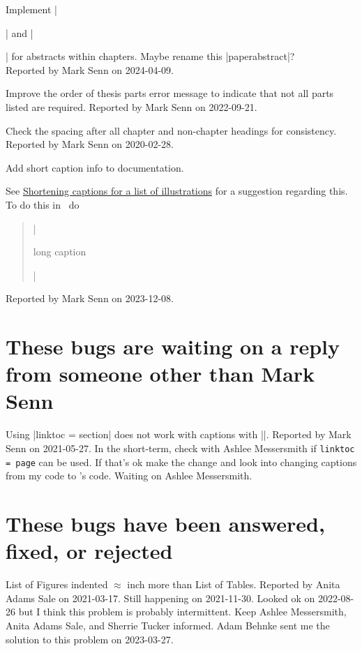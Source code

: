 Implement |\begin{chapterabstract}|
and |\end{chapterabstract}|
for abstracts within chapters.
Maybe rename this |paperabstract|?\\
{\small
  Reported by Mark Senn on 2024-04-09.
}

Improve the order of thesis parts error message
to indicate that not all parts listed are required.
{\small
  Reported by Mark Senn on 2022-09-21.%
}

Check the spacing after all chapter and non-chapter headings
for consistency.
{\small
  Reported by Mark Senn on 2020-02-28.%
}

Add short caption info to documentation.
{\small
  See
  \href{https://www-chicagomanualofstyle-org.ezproxy.lib.purdue.edu/book/ed17/part1/ch03/psec040.html}{Shortening captions for a list of illustrations}
  for a suggestion regarding this.
  To do this in \LaTeXLogo\ do\hfil\break
  \begin{quote}
    |\caption[short caption]{long caption}|
  \end{quote}
  Reported by Mark Senn on 2023-12-08.%
}

\section{These bugs are waiting on a reply from someone other than Mark Senn}

Using
|linktoc = section|
does not work with captions with
|\frac|.
{\small
  Reported by Mark Senn on 2021-05-27.
  In the short-term,
  check with Ashlee Messersmith
  if {\tt linktoc = page} can be used.
  If that's ok make the change
  and look into changing captions from my code
  to \LaTeXLogo's code.
  Waiting on Ashlee Messersmith.
}


\section{These bugs have been answered, fixed, or rejected}

List of Figures indented $\approx$ inch
more than List of Tables.
{\small
  Reported by Anita Adams Sale on 2021-03-17.
  Still happening on 2021-11-30.
  Looked ok on 2022-08-26
  but I think this problem is probably intermittent.
  Keep Ashlee Messersmith,
  Anita Adams Sale,
  and Sherrie Tucker informed.
  Adam Behnke sent me the solution to this problem on 2023-03-27.
}

